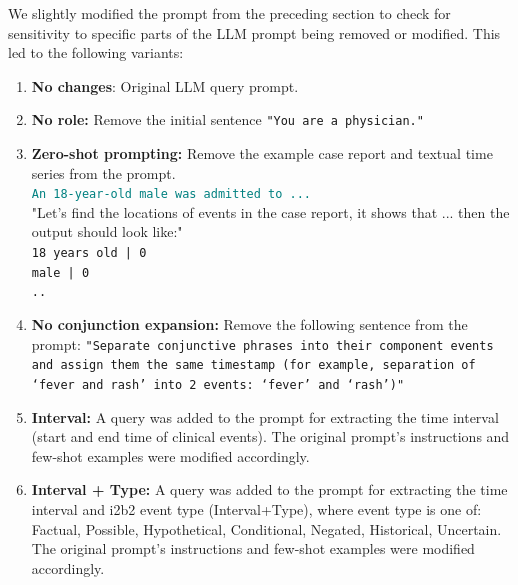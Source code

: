 We slightly modified the prompt from the preceding section to check for sensitivity to specific parts of the LLM prompt being removed or modified.
This led to the following variants:
\begin{enumerate}
    \item \textbf{No changes}: Original LLM query prompt. %
    
    \item \textbf{No role:} Remove the initial sentence \texttt{"You are a physician."}
    
    \item \textbf{Zero-shot prompting:} Remove the example case report and textual time series from the prompt. \\
    \textcolor{teal}{\texttt{An 18-year-old male was admitted to ...}}\\
    "Let's find the locations of events in the case report, it shows that ... then the output should look like:"\\
    \texttt{18 years old | 0 \\
    male | 0 \\
    ..}

    \item \textbf{No conjunction expansion:} Remove the following sentence from the prompt: \texttt{"Separate conjunctive phrases into their component events and assign them the same timestamp (for example, separation of ‘fever and rash’ into 2 events: ‘fever’ and ‘rash’)"}
    
    \item \textbf{Interval:} A query was added to the prompt for extracting the time interval (start and end time of clinical events). The original prompt’s instructions and few-shot examples were modified accordingly. 
    
    \item \textbf{Interval + Type:} A query was added to the prompt for extracting the time interval and i2b2
    event type (Interval+Type), where event type is one of: Factual, Possible, Hypothetical, Conditional, Negated, Historical, Uncertain. The original prompt’s instructions and few-shot examples were modified accordingly. 
\end{enumerate}

